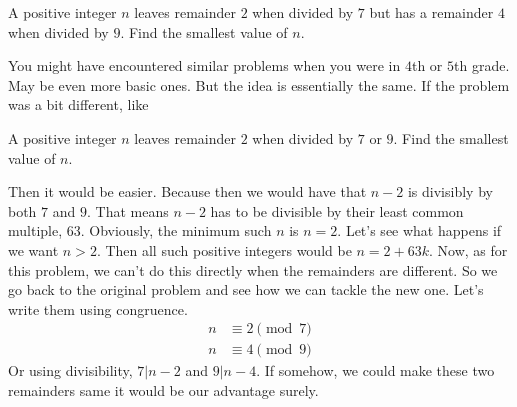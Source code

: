 \documentclass{subfile}
\begin{document}
	\begin{problem}
		A positive integer $n$ leaves remainder $2$ when divided by $7$ but has a remainder $4$ when divided by $9$. Find the smallest value of $n$.
	\end{problem}
	You might have encountered similar problems when you were in $4$th or $5$th grade. May be even more basic ones. But the idea is essentially the same. If the problem was a bit different, like
	\begin{problem}
		A positive integer $n$ leaves remainder $2$ when divided by $7$ or $9$. Find the smallest value of $n$.
	\end{problem}
	Then it would be easier. Because then we would have that $n-2$ is divisibly by both $7$ and $9$. That means $n-2$ has to be divisible by their least common multiple, $63$. Obviously, the minimum such $n$ is $n=2$. Let's see what happens if we want $n>2$. Then all such positive integers would be $n=2+63k$. Now, as for this problem, we can't do this directly when the remainders are different. So we go back to the original problem and see how we can tackle the new one. Let's write them using congruence.
	\begin{align*}
	n & \equiv2\pmod{7}\\
	n & \equiv4\pmod{9}
	\end{align*}
	Or using divisibility, $7|n-2$ and $9|n-4$. If somehow, we could make these two remainders same it would be our advantage surely.
	
\end{document}
